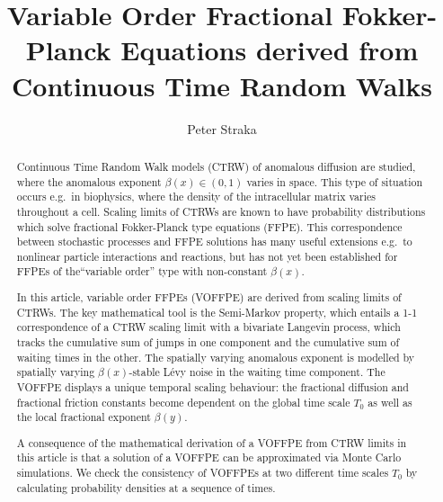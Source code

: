 \documentclass[a4paper,12pt]{elsarticle}
\numberwithin{equation}{section}
\theoremstyle{plain}
\theoremstyle{definition}
\theoremstyle{remark}
\numberwithin{equation}{section}
\newcommand{\1}{\mathbf 1}
\begin{document}
\begin{frontmatter}

\title{Variable Order Fractional Fokker-Planck Equations derived from 
Continuous Time Random Walks}
\author[UNSW]{Peter Straka}
\address[UNSW]{School of Mathematics \& Statistics, UNSW Sydney, Sydney NSW 2052, Australia}
 

\begin{abstract}
Continuous Time Random Walk models (CTRW) of anomalous diffusion are 
studied, 
where the anomalous exponent $\beta(x) \in (0,1)$ varies in space.  This 
type of situation occurs e.g.\ in biophysics, where the density of the 
intracellular matrix varies throughout a cell.  Scaling limits of CTRWs
are known to have probability distributions which solve fractional 
Fokker-Planck type equations (FFPE).  This correspondence between 
stochastic processes and FFPE solutions has many useful extensions e.g.\ 
to nonlinear particle interactions and reactions, but has not yet been
established for FFPEs of the``variable order'' type with non-constant 
$\beta(x)$. 

In this article, variable order FFPEs (VOFFPE) are derived from scaling 
limits of CTRWs.  The key mathematical tool is the Semi-Markov property,
which entails a 1-1 correspondence 
of a CTRW scaling limit with a bivariate Langevin process, which tracks the
cumulative sum of jumps in one component and the cumulative sum of waiting 
times in the other. The spatially varying anomalous exponent is
modelled by spatially varying $\beta(x)$-stable L\'evy noise in the 
waiting time component. 
The VOFFPE displays a unique temporal 
scaling behaviour: 
the fractional diffusion and fractional friction constants become dependent 
on the global time scale $T_0$ as well as the local fractional exponent 
$\beta(y)$.

A consequence of the mathematical derivation of a VOFFPE from CTRW limits 
in this article is that a solution of a VOFFPE can be approximated via 
Monte Carlo simulations.  
We check the consistency of VOFFPEs at two different time scales $T_0$ by 
calculating probability densities at a sequence of times.

\end{abstract}




\end{frontmatter}
\end{document}
